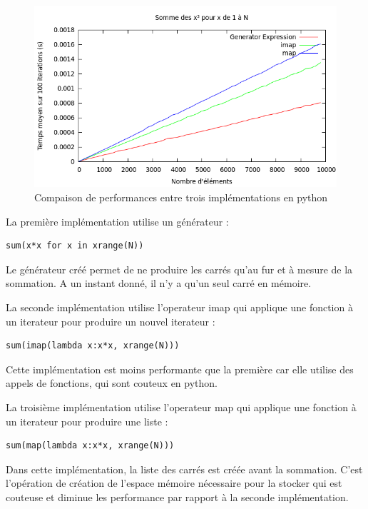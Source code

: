 \documentclass[a4paper]{article}
\begin{document}
\begin{figure}[h]
  \includegraphics[scale=0.5]{./Pictures/GenExpMapImapPy}
  \caption{Compaison de performances entre trois implémentations en python}
  \label{GenExpMapImapPy}
\end{figure}

La première implémentation utilise un générateur :

\begin{verbatim}
sum(x*x for x in xrange(N))
\end{verbatim}

Le générateur créé permet de ne produire les carrés qu'au fur et à mesure de la sommation. A un instant donné, il n'y a qu'un seul carré en mémoire.


La seconde implémentation utilise l'operateur imap qui applique une fonction à un iterateur pour produire un nouvel iterateur :

\begin{verbatim}
sum(imap(lambda x:x*x, xrange(N)))
\end{verbatim}

Cette implémentation est moins performante que la première car elle utilise des appels de fonctions, qui sont couteux en python.


La troisième implémentation utilise l'operateur map qui applique une fonction à un iterateur pour produire une liste :

\begin{verbatim}
sum(map(lambda x:x*x, xrange(N)))
\end{verbatim}

Dans cette implémentation, la liste des carrés est créée avant la sommation. C'est l'opération de création de l'espace mémoire nécessaire pour la stocker qui est couteuse et diminue les performance par rapport à la seconde implémentation.
\end{document}
